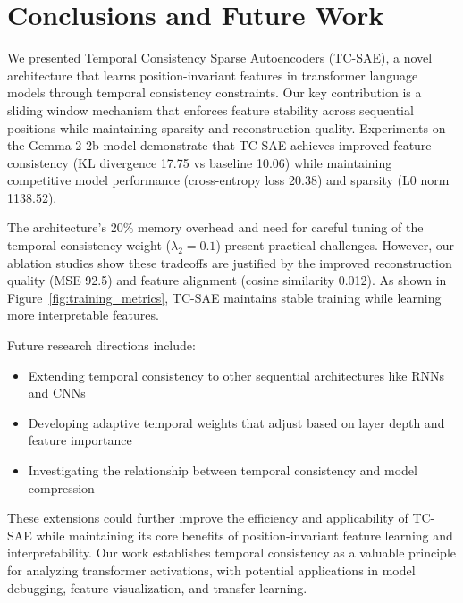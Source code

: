 \documentclass{article} %
\begin{document}
\section{Conclusions and Future Work}
\label{sec:conclusion}

We presented Temporal Consistency Sparse Autoencoders (TC-SAE), a novel architecture that learns position-invariant features in transformer language models through temporal consistency constraints. Our key contribution is a sliding window mechanism that enforces feature stability across sequential positions while maintaining sparsity and reconstruction quality. Experiments on the Gemma-2-2b model demonstrate that TC-SAE achieves improved feature consistency (KL divergence 17.75 vs baseline 10.06) while maintaining competitive model performance (cross-entropy loss 20.38) and sparsity (L0 norm 1138.52).

The architecture's 20\% memory overhead and need for careful tuning of the temporal consistency weight ($\lambda_2 = 0.1$) present practical challenges. However, our ablation studies show these tradeoffs are justified by the improved reconstruction quality (MSE 92.5) and feature alignment (cosine similarity 0.012). As shown in Figure~\ref{fig:training_metrics}, TC-SAE maintains stable training while learning more interpretable features.

Future research directions include:
\begin{itemize}
    \item Extending temporal consistency to other sequential architectures like RNNs and CNNs
    \item Developing adaptive temporal weights that adjust based on layer depth and feature importance
    \item Investigating the relationship between temporal consistency and model compression
\end{itemize}

These extensions could further improve the efficiency and applicability of TC-SAE while maintaining its core benefits of position-invariant feature learning and interpretability. Our work establishes temporal consistency as a valuable principle for analyzing transformer activations, with potential applications in model debugging, feature visualization, and transfer learning.



\end{document}

